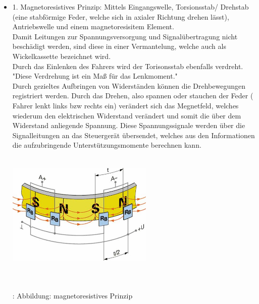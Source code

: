 \documentclass{article}
\begin{document}
				\begin{itemize}
					\item 1. Magnetoresistives Prinzip:
							 Mittels Eingangswelle, Torsionsstab/ Drehstab (eine stabförmige Feder, welche sich in axialer Richtung drehen lässt), Antriebswelle und einem magnetoresisitem Element. \\
							 Damit Leitungen zur Spannungsversorgung und Signalübertragung nicht beschädigt werden, sind diese in einer Vermantelung, welche auch als Wickelkassette bezeichnet wird.\\
							 
							 Durch das Einlenken des Fahrers wird der Torisonsstab ebenfalls verdreht. "Diese Verdrehung ist ein Maß für das Lenkmoment."\cite{TS12}\\
							 Durch gezieltes Aufbringen von Widerständen können die Drehbewegungen registriert werden. Durch das Drehen, also spannen oder stauchen der Feder ( Fahrer lenkt links bzw rechts ein) verändert sich das Megnetfeld, welches wiederum den elektrischen Widerstand verändert und somit die über dem Widerstand anliegende Spannung. Diese Spannungssignale werden über die Signalleitungen an das Steuergerät übersendet, welches aus den Informationen die aufzubringende Unterstützungsmomente berechnen kann.
										 
							\begin{center}
								\includegraphics[width=7cm, height=6cm] {Images/Kapitel5/lenkdrehmomentsensor.png}
								\caption {\\\cite{TS13}: Abbildung: magnetoresistives Prinzip}
							\end{center}			 
							\\
							 

\end{itemize}
\end{document}
